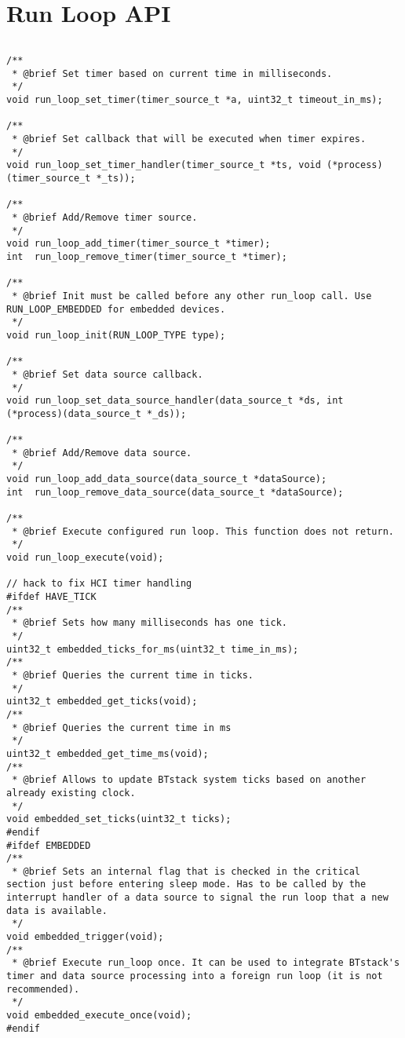 \section{Run Loop API}
\label{appendix:api_run_loop}
$ $
\begin{lstlisting}
/**
 * @brief Set timer based on current time in milliseconds.
 */
void run_loop_set_timer(timer_source_t *a, uint32_t timeout_in_ms);

/**
 * @brief Set callback that will be executed when timer expires.
 */
void run_loop_set_timer_handler(timer_source_t *ts, void (*process)(timer_source_t *_ts));

/**
 * @brief Add/Remove timer source.
 */
void run_loop_add_timer(timer_source_t *timer); 
int  run_loop_remove_timer(timer_source_t *timer);

/**
 * @brief Init must be called before any other run_loop call. Use RUN_LOOP_EMBEDDED for embedded devices.
 */
void run_loop_init(RUN_LOOP_TYPE type);

/**
 * @brief Set data source callback.
 */
void run_loop_set_data_source_handler(data_source_t *ds, int (*process)(data_source_t *_ds));

/**
 * @brief Add/Remove data source.
 */
void run_loop_add_data_source(data_source_t *dataSource);
int  run_loop_remove_data_source(data_source_t *dataSource);

/**
 * @brief Execute configured run loop. This function does not return.
 */
void run_loop_execute(void);

// hack to fix HCI timer handling
#ifdef HAVE_TICK
/**
 * @brief Sets how many milliseconds has one tick.
 */
uint32_t embedded_ticks_for_ms(uint32_t time_in_ms);
/**
 * @brief Queries the current time in ticks.
 */
uint32_t embedded_get_ticks(void);
/**
 * @brief Queries the current time in ms
 */
uint32_t embedded_get_time_ms(void);
/**
 * @brief Allows to update BTstack system ticks based on another already existing clock.
 */
void embedded_set_ticks(uint32_t ticks);
#endif
#ifdef EMBEDDED
/**
 * @brief Sets an internal flag that is checked in the critical section just before entering sleep mode. Has to be called by the interrupt handler of a data source to signal the run loop that a new data is available.
 */
void embedded_trigger(void);    
/**
 * @brief Execute run_loop once. It can be used to integrate BTstack's timer and data source processing into a foreign run loop (it is not recommended).
 */
void embedded_execute_once(void);
#endif
\end{lstlisting}
\pagebreak
